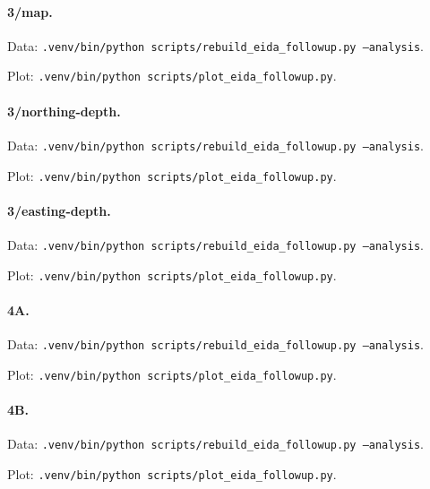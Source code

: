 \paragraph{3/map.}
\par Data: \texttt{.venv/bin/python scripts/rebuild\_eida\_followup.py --analysis}.
\par Plot: \texttt{.venv/bin/python scripts/plot\_eida\_followup.py}.
\par{}
\paragraph{3/northing-depth.}
\par Data: \texttt{.venv/bin/python scripts/rebuild\_eida\_followup.py --analysis}.
\par Plot: \texttt{.venv/bin/python scripts/plot\_eida\_followup.py}.
\par{}
\paragraph{3/easting-depth.}
\par Data: \texttt{.venv/bin/python scripts/rebuild\_eida\_followup.py --analysis}.
\par Plot: \texttt{.venv/bin/python scripts/plot\_eida\_followup.py}.
\par{}
\paragraph{4A.}
\par Data: \texttt{.venv/bin/python scripts/rebuild\_eida\_followup.py --analysis}.
\par Plot: \texttt{.venv/bin/python scripts/plot\_eida\_followup.py}.
\par{}
\par{}
\par{}
\paragraph{4B.}
\par Data: \texttt{.venv/bin/python scripts/rebuild\_eida\_followup.py --analysis}.
\par Plot: \texttt{.venv/bin/python scripts/plot\_eida\_followup.py}.
\par{}
\par{}
\par{}
